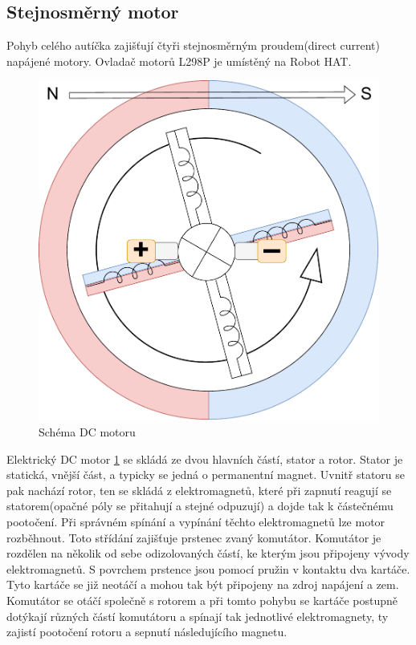 \newpage
\subsection*{Stejnosměrný motor}
Pohyb celého autíčka zajišťují čtyři stejnosměrným proudem(direct current) napájené motory. Ovladač motorů L298P je umístěný na Robot HAT.

\begin{figure}[h!]
	\centering
	\includegraphics[scale=0.5]{obrazky-figures/dc_motor.pdf}
	\caption{Schéma DC motoru}
	\label{fig:dc_motor}
\end{figure}

Elektrický DC motor \ref{fig:dc_motor} se skládá ze dvou hlavních částí, stator a rotor. Stator je statická, vnější část, a typicky se jedná o permanentní magnet. Uvnitř statoru se pak nachází rotor, ten se skládá z elektromagnetů, které při zapnutí reagují se statorem(opačné póly se přitahují a stejné odpuzují) a dojde tak k částečnému pootočení. Při správném spínání a vypínání těchto elektromagnetů lze motor rozběhnout. 
Toto střídání zajišťuje prstenec zvaný komutátor. Komutátor je rozdělen na několik od sebe odizolovaných částí, ke kterým jsou připojeny vývody elektromagnetů. S povrchem prstence jsou pomocí pružin v kontaktu dva kartáče. Tyto kartáče se již neotáčí a mohou tak být připojeny na zdroj napájení a zem. Komutátor se otáčí společně s rotorem a při tomto pohybu se kartáče postupně dotýkají různých částí komutátoru a spínají tak jednotlivé elektromagnety, ty zajistí pootočení rotoru a sepnutí následujícího magnetu. \cite[std:~28-36]{mobilní_roboty}

